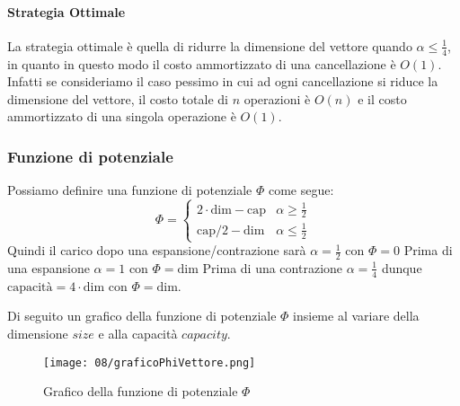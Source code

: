         \paragraph{Strategia Ottimale}
            La strategia ottimale è quella di ridurre la dimensione del vettore quando $\alpha\leq\frac{1}{4}$, in quanto in questo modo il costo ammortizzato di una cancellazione è $O(1)$. Infatti se consideriamo il caso pessimo in cui ad ogni cancellazione si riduce la dimensione del vettore, il costo totale di $n$ operazioni è $O(n)$ e il costo ammortizzato di una singola operazione è $O(1)$.
        \subsubsection{Funzione di potenziale}
            Possiamo definire una funzione di potenziale $\Phi$ come segue:
            $$
                \Phi = \begin{cases}
                    2\cdot \text{dim} - \text{cap} & \alpha\geq \frac{1}{2}\\
                    \text{cap}/2 - \text{dim} & \alpha\leq \frac{1}{2}
                \end{cases}
            $$
            Quindi il carico dopo una espansione/contrazione sarà $\alpha=\frac12$ con $\Phi=0$\newline
            Prima di una espansione $\alpha=1$ con $\Phi=\text{dim}$\newline
            Prima di una contrazione $\alpha=\frac14$ dunque $\text{capacità}=4\cdot\text{dim}$ con $\Phi=\text{dim}$.
        
            Di seguito un grafico della funzione di potenziale $\Phi$ insieme al variare della dimensione $size$ e alla capacità $capacity$.
            \begin{figure}[H]
                \centering
                \texttt{[image: 08/graficoPhiVettore.png]}
                \caption{Grafico della funzione di potenziale $\Phi$}
            \end{figure}